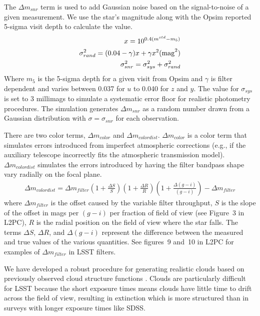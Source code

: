 \documentclass[12pt,preprint]{aastex}
\begin{document}
The $\Delta m_{snr}$ term is used to add Gaussian noise based on the signal-to-noise of a given measurement.  We use the star's magnitude along with the Opsim reported 5-sigma visit depth to calculate the value. 
\begin{eqnarray}
x = 10^{0.4(m^{std} - m_5)} \\
\sigma^2_{rand} = (0.04-\gamma)x+\gamma x^2 \rm{ (mag}^2) \\
\sigma^2_{snr} = \sigma^2_{sys}+\sigma^2_{rand}
\end{eqnarray}
Where $m_5$ is the 5-sigma depth for a given visit from Opsim and $\gamma$ is filter dependent and varies between 0.037 for $u$ to 0.040 for $z$ and $y$.  The value for $\sigma_{sys}$ is set to 3 millimags to simulate a systematic error floor for realistic photometry procedures.  The simulation generates $\Delta m_{snr}$ as a random number drawn from a Gaussian distribution with $\sigma=\sigma_{snr}$ for each observation.  


There are two color terms, $\Delta m_{color}$ and $\Delta m_{colordist}$.  $\Delta m_{color}$ is a color term that simulates errors introduced from imperfect atmospheric corrections (e.g., if the auxiliary telescope incorrectly fits the atmospheric transmission model).  $\Delta m_{colordist}$ simulates the errors introduced by having the filter bandpass shape vary radially on the focal plane.  
\begin{eqnarray}
\Delta m_{colordist} = \Delta m_{filter} (1+\frac{\Delta S}{S})(1+\frac{\Delta R}{R})(1+\frac{\Delta (g-i)}{(g-i)})-\Delta m_{filter}
\end{eqnarray}
where $\Delta m_{filter}$ is the offset caused by the variable filter throughput, $S$ is the slope of the offset in mags per $(g-i)$ per fraction of field of view (see Figure~3 in L2PC), $R$ is the radial position on the field of view where the star falls.  The terms $\Delta S$, $\Delta R$, and $\Delta (g-i)$ represent the difference between the measured and true values of the various quantities.  See figures~9 and~10 in L2PC for examples of $\Delta m_{filter}$ in LSST filters.



We have developed a robust procedure for generating realistic clouds based on previously observed cloud structure functions \citep{Ivezic2007,Burke2010}. Clouds are particularly difficult for LSST because the short exposure times means clouds have little time to drift across the field of view, resulting in extinction which is more structured than in surveys with longer exposure times like SDSS.  
\end{document}
